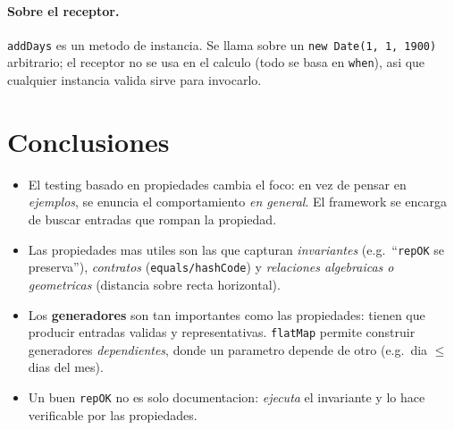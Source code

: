 \documentclass[12pt,a4paper]{article}
\begin{document}
\paragraph{Sobre el receptor.} \texttt{addDays} es un metodo de instancia. Se llama sobre un
\texttt{new Date(1, 1, 1900)} arbitrario; el receptor no se usa en el calculo (todo se basa en
\texttt{when}), asi que cualquier instancia valida sirve para invocarlo.

\section*{Conclusiones}

\begin{itemize}
  \item El testing basado en propiedades cambia el foco: en vez de pensar en
  \emph{ejemplos}, se enuncia el comportamiento \emph{en general}. El framework se encarga de
  buscar entradas que rompan la propiedad.
  \item Las propiedades mas utiles son las que capturan \emph{invariantes} (e.g.\ ``\texttt{repOK}
  se preserva''), \emph{contratos} (\texttt{equals/hashCode}) y \emph{relaciones algebraicas o
  geometricas} (distancia sobre recta horizontal).
  \item Los \textbf{generadores} son tan importantes como las propiedades: tienen que producir
  entradas validas y representativas. \texttt{flatMap} permite construir generadores
  \emph{dependientes}, donde un parametro depende de otro (e.g.\ dia $\le$ dias del mes).
  \item Un buen \texttt{repOK} no es solo documentacion: \emph{ejecuta} el invariante y lo
  hace verificable por las propiedades.
\end{itemize}
\end{document}
